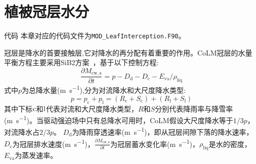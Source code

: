 
\chapter{植被冠层水分}\label{植被冠层截留}

\begin{mymdframed}{代码}
  本章对应的代码文件为\texttt{MOD\_LeafInterception.F90}。
\end{mymdframed}

冠层是降水的首要接触层,它对降水的再分配有着重要的作用。CoLM冠层的水量平衡方程主要采用SiB2方案~\citep{sellers1996revised}，基于以下控制方程:
\begin{equation}\label{eq:冠层水量控制方程}
  \frac{\partial M_{\mathrm{cw,s}}}{\partial t} = p-D_{\mathrm{d}}-D_{\mathrm{c}}-E_{\mathrm{va}} / \rho_{\mathrm{liq}}
\end{equation}
式中$p$为总降水量(\unit{m.s^{-1}}),分为对流降水和大尺度降水类型:
\begin{equation}\label{eq:降水类型}
  p=p_{\mathrm{c}}+p_{\mathrm{l}}=\left(R_{\mathrm{c}}+S_{\mathrm{c}}\right)+\left(R_{\mathrm{l}}+S_{\mathrm{l}}\right)
\end{equation}
其中下标$\rm c$和$\rm l$代表对流和大尺度降水类型，$R$和$S$分别代表降雨率与降雪率(\unit{m.s^{-1}})。当驱动强迫场中只有总降水可用时，CoLM假设大尺度降水等于$1/3p$，对流降水占$2/3p$。
$D_{\mathrm {d}} $为降雨穿透速率(\unit{m.s^{-1}})，即从冠层间隙下落的降水速率，$D_{\mathrm {c}} $为冠层排水速度(\unit{m.s^{-1}})，$\frac{\partial M_{\mathrm{cw,s}}}{\partial t}$为冠层蓄水变化率(\unit{m.s^{-1}})，$\rho_{\mathrm {liq}} $是水的密度，$E_{\mathrm{va}}$为蒸发速率。

